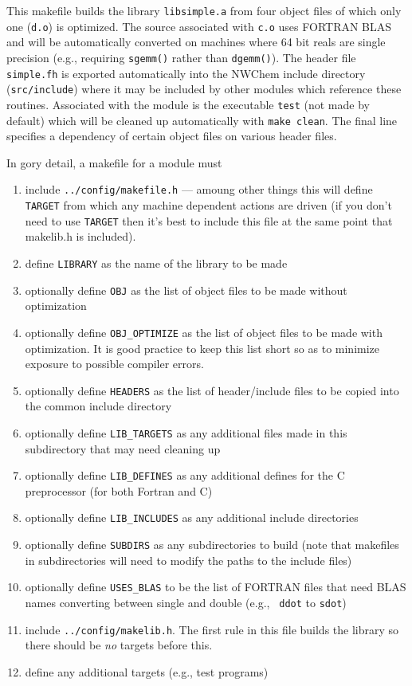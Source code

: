 This makefile builds the library {\tt libsimple.a} from four object
files of which only one ({\tt d.o}) is optimized.  The source
associated with {\tt c.o} uses FORTRAN BLAS and will be automatically
converted on machines where 64 bit reals are single precision (e.g.,
requiring {\tt sgemm()} rather than {\tt dgemm()}).  The header file
{\tt simple.fh} is exported automatically into the NWChem include
directory ({\tt src/include}) where it may be included by other
modules which reference these routines.  Associated with the module is
the executable {\tt test} (not made by default) which will be cleaned
up automatically with \verb+make clean+.  The final line
specifies a dependency of certain object files on various header
files.

In gory detail, a makefile for a module must
\begin{enumerate}
\item include \verb+../config/makefile.h+ --- amoung other things this will
    define {\tt TARGET} from which any machine dependent actions are driven
    (if you don't need to use {\tt TARGET} then it's best to include this
     file at the same point that makelib.h is included).
\item define {\tt LIBRARY} as the name of the library to be made
\item optionally define {\tt OBJ} as the list of object files to be made 
    without optimization
\item optionally define {\tt OBJ\_OPTIMIZE} as the list of object files to 
    be made with optimization.  It is good practice to keep this list 
    short so as to minimize exposure to possible compiler errors.
\item optionally define {\tt HEADERS} as the list of header/include files to be
    copied into the common include directory
\item optionally define {\tt LIB\_TARGETS} as any additional files made in
    this subdirectory that may need cleaning up
\item optionally define {\tt LIB\_DEFINES} as any additional defines for
   the C preprocessor (for both Fortran and C)
 \item optionally define {\tt LIB\_INCLUDES} as any additional include
   directories
\item optionally define {\tt SUBDIRS} as any subdirectories to build (note
  that makefiles in subdirectories will need to modify the paths to
  the include files)
\item optionally define {\tt USES\_BLAS} to be the list of FORTRAN files that
    need BLAS names converting between single and double (e.g., {\tt
      ddot} to  {\tt sdot})
\item include \verb+../config/makelib.h+.  The first rule in this file
     builds the library so there should be {\em no} targets before this.
\item define any additional targets (e.g., test programs)
\end{enumerate}

